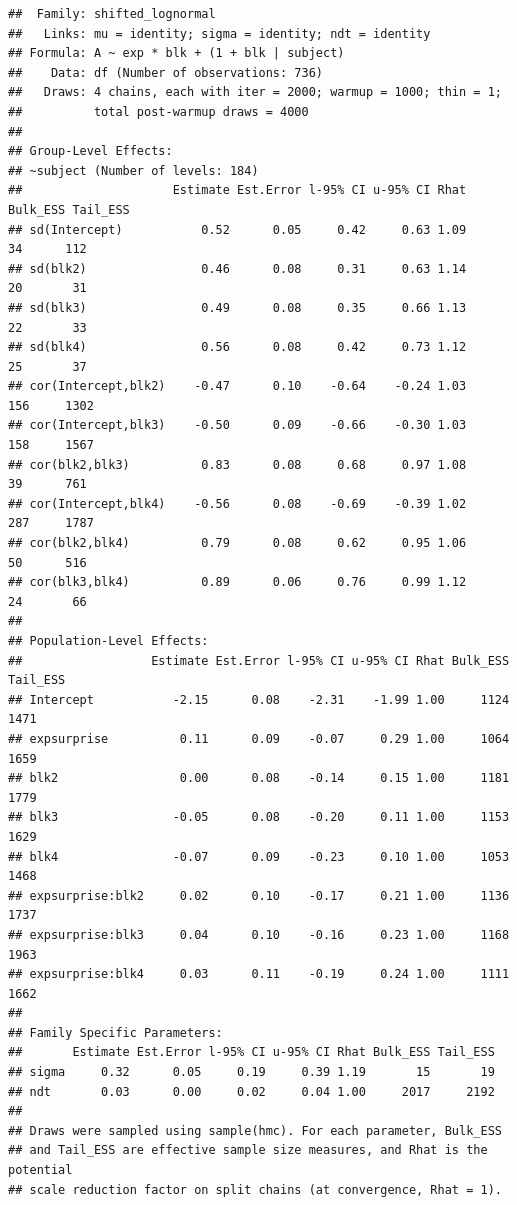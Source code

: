 \documentclass[
]{article}
\begin{document}
\begin{verbatim}
##  Family: shifted_lognormal 
##   Links: mu = identity; sigma = identity; ndt = identity 
## Formula: A ~ exp * blk + (1 + blk | subject) 
##    Data: df (Number of observations: 736) 
##   Draws: 4 chains, each with iter = 2000; warmup = 1000; thin = 1;
##          total post-warmup draws = 4000
## 
## Group-Level Effects: 
## ~subject (Number of levels: 184) 
##                     Estimate Est.Error l-95% CI u-95% CI Rhat Bulk_ESS Tail_ESS
## sd(Intercept)           0.52      0.05     0.42     0.63 1.09       34      112
## sd(blk2)                0.46      0.08     0.31     0.63 1.14       20       31
## sd(blk3)                0.49      0.08     0.35     0.66 1.13       22       33
## sd(blk4)                0.56      0.08     0.42     0.73 1.12       25       37
## cor(Intercept,blk2)    -0.47      0.10    -0.64    -0.24 1.03      156     1302
## cor(Intercept,blk3)    -0.50      0.09    -0.66    -0.30 1.03      158     1567
## cor(blk2,blk3)          0.83      0.08     0.68     0.97 1.08       39      761
## cor(Intercept,blk4)    -0.56      0.08    -0.69    -0.39 1.02      287     1787
## cor(blk2,blk4)          0.79      0.08     0.62     0.95 1.06       50      516
## cor(blk3,blk4)          0.89      0.06     0.76     0.99 1.12       24       66
## 
## Population-Level Effects: 
##                  Estimate Est.Error l-95% CI u-95% CI Rhat Bulk_ESS Tail_ESS
## Intercept           -2.15      0.08    -2.31    -1.99 1.00     1124     1471
## expsurprise          0.11      0.09    -0.07     0.29 1.00     1064     1659
## blk2                 0.00      0.08    -0.14     0.15 1.00     1181     1779
## blk3                -0.05      0.08    -0.20     0.11 1.00     1153     1629
## blk4                -0.07      0.09    -0.23     0.10 1.00     1053     1468
## expsurprise:blk2     0.02      0.10    -0.17     0.21 1.00     1136     1737
## expsurprise:blk3     0.04      0.10    -0.16     0.23 1.00     1168     1963
## expsurprise:blk4     0.03      0.11    -0.19     0.24 1.00     1111     1662
## 
## Family Specific Parameters: 
##       Estimate Est.Error l-95% CI u-95% CI Rhat Bulk_ESS Tail_ESS
## sigma     0.32      0.05     0.19     0.39 1.19       15       19
## ndt       0.03      0.00     0.02     0.04 1.00     2017     2192
## 
## Draws were sampled using sample(hmc). For each parameter, Bulk_ESS
## and Tail_ESS are effective sample size measures, and Rhat is the potential
## scale reduction factor on split chains (at convergence, Rhat = 1).
\end{verbatim}
\end{document}
